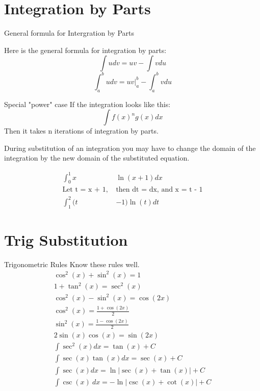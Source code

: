 \documentclass[letterpaper,10pt,twoside,twocolumn,openany]{book}
\begin{document}
\newpage



\section{Integration by Parts}
\begin{paperbox}[]{General formula for Intergration by Parts}
    
    Here is the general formula for integration by parts:
    \begin{equation}
        \int udv = uv - \int vdu
    \end{equation}
    \begin{equation}
        \int_a^b udv = uv|_a^b - \int_a^b vdu
    \end{equation}
\end{paperbox}

\begin{commentbox}{Special "power" case}
    If the integration looks like this:
    \begin{equation}
        \int f(x)^ng(x) dx
    \end{equation}
    Then it takes n iterations of integration by parts.
\end{commentbox}

During substitution of an integration you may have to change the domain of the integration by the new domain of the substituted equation.
\begin{commentbox}{}
    \begin{align*}
        \int_0^1 x &\ln(x+1) dx\\
        \text{Let t = x + 1, }&\text{then dt = dx, and x = t - 1}\\
        \int_1^2 (t&-1) \ln(t) dt
    \end{align*} 
\end{commentbox}
\newpage


\section{Trig Substitution}
\vspace{-0.4cm}
\begin{paperbox}[]{Trigonometric Rules}
    Know these rules well.    
    \begin{gather}
        \cos^2(x) + \sin^2(x) = 1\\
        1 + \tan^2(x) = \sec^2(x)\\
        \cos^2(x) - \sin^2(x) = \cos(2x)\\
        \cos^2(x) = \frac{1 + \cos(2x)}{2}\\
        \sin^2(x) = \frac{1 - \cos(2x)}{2}\\
        2 \sin(x) \cos(x) = \sin(2x)\\
        \int \sec^2(x) dx = \tan(x) + C\\
        \int \sec(x) \tan(x) dx = \sec(x) + C\\
        \int \sec(x) dx = \ln|\sec(x) + \tan(x)| + C\\
        \int \csc(x)\ dx = -\ln|\csc(x) + \cot(x)| + C
    \end{gather}
\end{paperbox}
\end{document}
